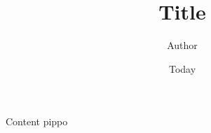 \documentclass[]{article}
\begin{document}
\title{Title}
\author{Author}
\date{Today}
\maketitle

Content
pippo \cite{einstein} 

\medskip

                                                                              

\end{document}

